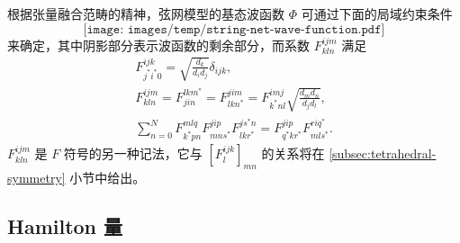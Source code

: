 根据张量融合范畴的精神，弦网模型的基态波函数 $\Phi$ 可通过下面的局域约束条件\cite{levin2005string}
\begin{equation}
  \texttt{[image: images/temp/string-net-wave-function.pdf]}
  \label{eq:string-net-local-rules}
\end{equation}
来确定，其中阴影部分表示波函数的剩余部分，而系数 $F^{ijm}_{kln}$ 满足
\begin{equation}
  \begin{gathered}
    F^{ijk}_{j^* i^* 0} = \sqrt{\frac{d_k}{d_i d_j}} \delta_{ijk}, \\
    F^{ijm}_{kln} = F^{lkm^*}_{jin} = F^{jim}_{lkn^*} = F^{imj}_{k^* nl} \sqrt{\frac{d_m d_n}{d_j d_l}}, \\
    \sum_{n=0}^N F^{mlq}_{k^*p n} F^{jip}_{mns^*} F^{js^* n}_{lkr^*} = F^{jip}_{q^* kr^*} F^{riq^*}_{mls^*}.
  \end{gathered}
\end{equation}
$F^{ijm}_{kln}$ 是 $F$ 符号的另一种记法，它与 $[F^{ijk}_l]_{mn}$ 的关系将在 \ref{subsec:tetrahedral-symmetry} 小节中给出。

\subsection{Hamilton 量}
\label{subsec:string-net-hamiltonian}

